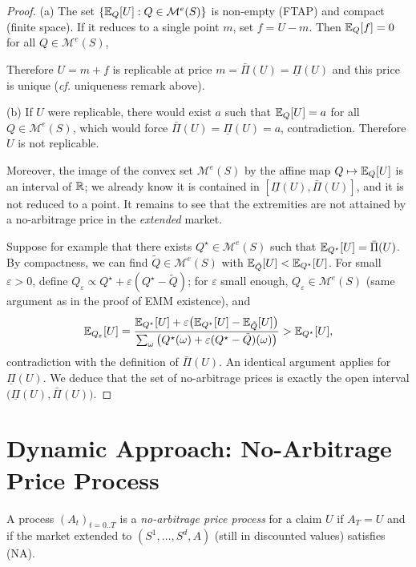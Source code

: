 \begin{proof}
(a) The set $\{\mathbb{E}_Q[U]:Q\in\mathcal{M}^e(S)\}$ is non-empty (FTAP) and compact (finite space).
If it reduces to a single point $m$, set $f=U-m$. Then $\mathbb{E}_Q[f]=0$ for all $Q\in\mathcal{M}^e(S)$,

Therefore $U=m+f$ is replicable at price $m=\bar\Pi(U)=\underline{\Pi}(U)$ and this price is unique
(\emph{cf.} uniqueness remark above).

(b) If $U$ were replicable, there would exist $a$ such that $\mathbb{E}_Q[U]=a$ for all $Q\in\mathcal{M}^e(S)$,
which would force $\bar\Pi(U)=\underline{\Pi}(U)=a$, contradiction. Therefore $U$ is not replicable.

Moreover, the image of the convex set $\mathcal{M}^e(S)$ by the affine map $Q\mapsto \mathbb{E}_Q[U]$
is an interval of $\mathbb{R}$; we already know it is contained in $[\underline{\Pi}(U),\bar\Pi(U)]$,
and it is not reduced to a point. It remains to see that the extremities are not attained by a no-arbitrage price
in the \emph{extended} market.

Suppose for example that there exists $Q^\star\in\mathcal{M}^e(S)$ such that
$\mathbb{E}_{Q^\star}[U]=\bar\Pi(U)$. By compactness, we can find $\tilde Q\in\mathcal{M}^e(S)$
with $\mathbb{E}_{\tilde Q}[U]<\mathbb{E}_{Q^\star}[U]$. For small $\varepsilon>0$, define
$Q_\varepsilon \propto Q^\star+\varepsilon(Q^\star-\tilde Q)$; for $\varepsilon$ small enough,
$Q_\varepsilon\in\mathcal{M}^e(S)$ (same argument as in the proof of EMM existence),
and
\[
\mathbb{E}_{Q_\varepsilon}[U]
=\frac{\mathbb{E}_{Q^\star}[U]+\varepsilon\big(\mathbb{E}_{Q^\star}[U]-\mathbb{E}_{\tilde Q}[U]\big)}
      {\sum_\omega \big(Q^\star(\omega)+\varepsilon(Q^\star-\tilde Q)(\omega)\big)}
>\mathbb{E}_{Q^\star}[U],
\]
contradiction with the definition of $\bar\Pi(U)$. An identical argument applies for $\underline{\Pi}(U)$.
We deduce that the set of no-arbitrage prices is exactly the open interval
$\big(\underline{\Pi}(U),\bar\Pi(U)\big)$.
\end{proof}

\section{Dynamic Approach: No-Arbitrage Price Process}

\begin{definition}\label{def:processus_prix_NA}
A process $(A_t)_{t=0..T}$ is a \emph{no-arbitrage price process} for a claim $U$
if $A_T=U$ and if the market extended to $(S^1,\dots,S^d,A)$ (still in discounted values)
satisfies (NA).
\end{definition}

